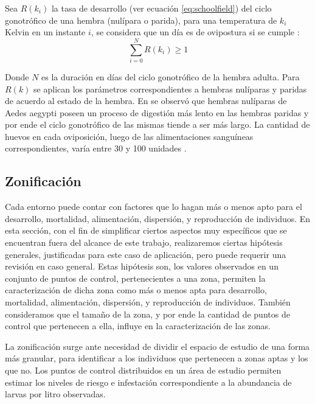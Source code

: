 Sea $R(k_{i})$ la tasa de desarrollo (ver ecuación \eqref{eq:schoolfield}) del ciclo gonotrófico
de una hembra (nulípara o parida), para una temperatura de $k_{i}$ Kelvin en un instante $i$, se
considera que un día es de ovipostura si se cumple :
\begin{equation}
\label{eq:ciclo-gonotrofico-ovipostura}
    \sum_{i=0}^{N} R(k_{i}) \geq 1
\end{equation}

Donde $N$ es la duración en días del ciclo gonotrófico de la hembra adulta. Para $R(k)$ se aplican
los parámetros correspondientes a hembras nulíparas y paridas de acuerdo al estado de la hembra.
En \cite{edman1987host} se observó que hembras nulíparas de Aedes aegypti poseen un proceso de
digestión más lento en las hembras paridas y por ende el ciclo gonotrófico de las mismas tiende
a ser más largo. La cantidad de huevos en cada oviposición, luego de las alimentaciones sanguíneas
correspondientes, varía entre 30 y 100 unidades \cite{luevano1993ciclo, beltran2001bionomia,cabezas2005dengue}.


\subsection{Zonificación}
\label{subsec:cap4-zonificacion}
Cada entorno puede contar con factores que lo hagan más o menos apto para el desarrollo,
mortalidad, alimentación, dispersión, y reproducción de individuos. En esta sección, con el fin de
simplificar ciertos aspectos muy específicos que se encuentran fuera del alcance de este trabajo,
realizaremos ciertas hipótesis generales, justificadas para este caso de aplicación, pero puede
requerir una revisión en caso general. Estas hipótesis son, los valores observados en un
conjunto de puntos de control, pertenecientes a una zona, permiten la caracterización de dicha
zona como más o menos apta para desarrollo, mortalidad, alimentación, dispersión, y reproducción de
individuos. También consideramos que el tamaño de la zona, y por ende la cantidad de puntos de
control que pertenecen a ella, influye en la caracterización de las zonas.

La zonificación surge ante necesidad de dividir el espacio de estudio de una forma más granular,
para identificar a los individuos que pertenecen a zonas aptas y los que no. Los puntos de control
distribuidos en un área de estudio permiten estimar los niveles de riesgo e infestación
correspondiente a la abundancia de larvas por litro observadas.

